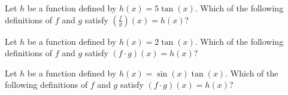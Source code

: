 \documentclass{ximera}
\author{Kenneth Berglund}
\begin{document}
\begin{exercise}
Let $h$ be a function defined by $h(x) = 5\tan(x)$. Which of the following definitions of $f$ and $g$ satisfy $\left(\frac{f}{g}\right)(x) = h(x)$?
\begin{multipleChoice}
\end{multipleChoice}

Let $h$ be a function defined by $h(x) = 2\tan(x)$. Which of the following definitions of $f$ and $g$ satisfy $(f \cdot g)(x) = h(x)$?
\begin{multipleChoice}
\end{multipleChoice}

Let $h$ be a function defined by $h(x) = \sin(x)\tan(x)$. Which of the following definitions of $f$ and $g$ satisfy $(f \cdot g)(x) = h(x)$?
\begin{multipleChoice}
\end{multipleChoice}

\end{exercise}
\end{document}
